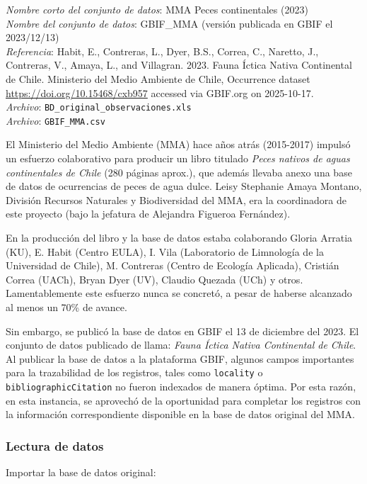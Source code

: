 \documentclass[sn-apa,pdflatex]{sn-jnl}
\begin{document}
\emph{Nombre corto del conjunto de datos}: MMA Peces continentales
(2023)\\
\emph{Nombre del conjunto de datos}: GBIF\_MMA (versión publicada en
GBIF el 2023/12/13)\\
\emph{Referencia}: Habit, E., Contreras, L., Dyer, B.S., Correa, C.,
Naretto, J., Contreras, V., Amaya, L., and Villagran. 2023. Fauna Íctica
Nativa Continental de Chile. Ministerio del Medio Ambiente de Chile,
Occurrence dataset \url{https://doi.org/10.15468/cxb957} accessed via
GBIF.org on 2025-10-17. \citep{Habit2023}\\
\emph{Archivo}: \texttt{BD\_original\_observaciones.xls}\\
\emph{Archivo}: \texttt{GBIF\_MMA.csv}

El Ministerio del Medio Ambiente (MMA) hace años atrás (2015-2017)
impulsó un esfuerzo colaborativo para producir un libro titulado
\emph{Peces nativos de aguas continentales de Chile} (280 páginas
aprox.), que además llevaba anexo una base de datos de ocurrencias de
peces de agua dulce. Leisy Stephanie Amaya Montano, División Recursos
Naturales y Biodiversidad del MMA, era la coordinadora de este proyecto
(bajo la jefatura de Alejandra Figueroa Fernández).

En la producción del libro y la base de datos estaba colaborando Gloria
Arratia (KU), E. Habit (Centro EULA), I. Vila (Laboratorio de Limnología
de la Universidad de Chile), M. Contreras (Centro de Ecología Aplicada),
Cristián Correa (UACh), Bryan Dyer (UV), Claudio Quezada (UCh) y otros.
Lamentablemente este esfuerzo nunca se concretó, a pesar de haberse
alcanzado al menos un 70\% de avance.

Sin embargo, se publicó la base de datos en GBIF el 13 de diciembre del
2023. El conjunto de datos publicado de llama: \emph{Fauna Íctica Nativa
Continental de Chile}. Al publicar la base de datos a la plataforma
GBIF, algunos campos importantes para la trazabilidad de los registros,
tales como \texttt{locality} o \texttt{bibliographicCitation} no fueron
indexados de manera óptima. Por esta razón, en esta instancia, se
aprovechó de la oportunidad para completar los registros con la
información correspondiente disponible en la base de datos original del
MMA.

\subsubsection{Lectura de datos}\label{lectura-de-datos-3}

Importar la base de datos original:
\end{document}
